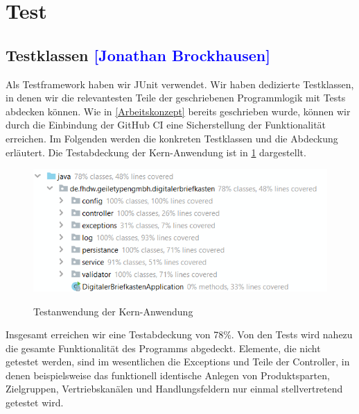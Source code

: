 

\section{Test}

\subsection{Testklassen \textcolor{blue}{[Jonathan Brockhausen]}}

Als Testframework haben wir JUnit verwendet. Wir haben dedizierte Testklassen, in denen wir die relevantesten Teile der geschriebenen Programmlogik mit Tests abdecken können. Wie in \cref{Arbeitskonzept} bereits geschrieben wurde, können wir durch die Einbindung der GitHub CI eine Sicherstellung der Funktionalität erreichen.
Im Folgenden werden die konkreten Testklassen und die Abdeckung erläutert. Die Testabdeckung der Kern-Anwendung ist in \cref{fig:coverage} dargestellt.

\begin{figure}[h!!]
    \centering
    \begin{minipage}[t]{1\textwidth}
        \caption{Testanwendung der Kern-Anwendung}
        \includegraphics[width=1\textwidth]{img/coverage.png}\\
        \label{fig:coverage}
    \end{minipage}
\end{figure}

Insgesamt erreichen wir eine Testabdeckung von 78\%. Von den Tests wird nahezu die gesamte Funktionalität des Programms abgedeckt. Elemente, die nicht getestet werden, sind im wesentlichen die Exceptions und Teile der Controller, in denen beispielsweise das funktionell identische Anlegen von Produktsparten, Zielgruppen, Vertriebskanälen und Handlungsfeldern nur einmal stellvertretend getestet wird.

